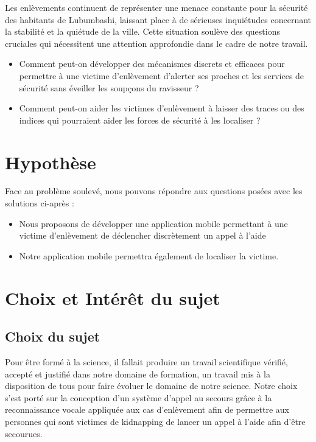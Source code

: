 Les enlèvements continuent de représenter une menace constante pour la sécurité des habitants de Lubumbashi, laissant place à de sérieuses inquiétudes concernant la stabilité et la quiétude de la ville.
Cette situation soulève des questions cruciales qui nécessitent une attention approfondie dans le cadre de notre travail.

\begin{itemize}
	\item Comment peut-on développer des mécanismes discrets et efficaces pour permettre à une victime d'enlèvement d'alerter ses proches et les services de sécurité sans éveiller les soupçons du ravisseur ? 
	
	\item Comment peut-on aider les victimes d'enlèvement à laisser des traces ou des indices qui pourraient aider les forces de sécurité à les localiser ?
	
\end{itemize}

\section{Hypothèse}
Face au problème soulevé, nous pouvons répondre aux questions posées avec les solutions ci-après :

\begin{itemize}
\item Nous proposons de développer une application mobile permettant à une victime d'enlèvement de déclencher discrètement un appel à l'aide

\item Notre application mobile permettra également de localiser la victime.

\end{itemize}

\section{Choix et Intérêt du sujet}

\subsection{Choix du sujet}

Pour être formé à la science, il fallait produire un travail scientifique vérifié, accepté et justifié dans notre domaine de formation, un travail mis à la disposition de tous pour faire évoluer le domaine de notre science. Notre choix s'est porté sur la conception d'un système d’appel au secours grâce à la reconnaissance vocale appliquée aux cas d'enlèvement afin de permettre aux personnes qui sont victimes de kidnapping de lancer un appel à l'aide afin d'être secourues.

